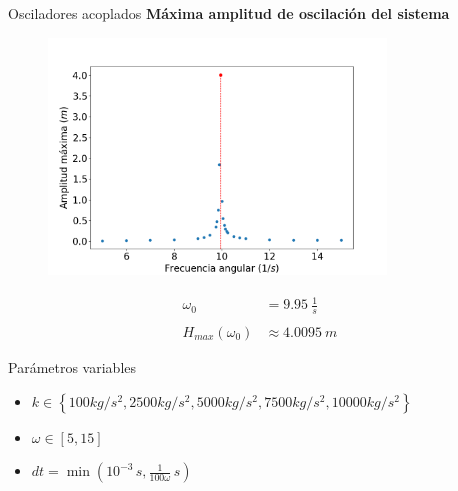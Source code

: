 \begin{frame}{Osciladores acoplados}
    \textbf{Máxima amplitud de oscilación del sistema}
    \begin{minipage}[c]{0.7\linewidth}
        \begin{figure}[H]
            \centering
            \includegraphics[width=0.8\textwidth]{pic/05-results/system_max_amplitude}
            \label{fig:system-max-amplitude}
        \end{figure}
    \end{minipage}
    \begin{minipage}[c]{0.25\linewidth}
        \large{
            \begin{equation*}
                \begin{aligned}
                    \omega_0 &= 9.95\ \frac{1}{s} \\ \\
                    H_{max}(\omega_0) &\approx 4.0095\ m
                \end{aligned}
            \end{equation*}
        }
    \end{minipage}
\end{frame}

\begin{frame}
    \begin{block}{Parámetros variables}
        \begin{itemize}
            \item $k \in \left\{100 kg/s^2, 2500 kg/s^2, 5000 kg/s^2, 7500 kg/s^2, 10000 kg/s^2\right\} $
            \item $\omega \in [5, 15]$
            \item $dt = \min\left(10^{-3}\,s, \frac{1}{100 \omega}\,s\right)$
        \end{itemize}
    \end{block}
\end{frame}

